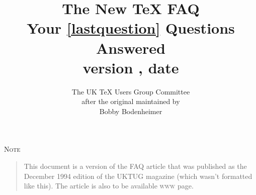 \documentclass[a4paper]{faq}
\begin{document}
\title{The New \TeX{} FAQ\\
       Your \protect\ref{lastquestion} Questions Answered\\
       version \fileversion, date \filedate}
\author{The UK \TeX{} Users Group Committee\\
after the original maintained by \\
Bobby Bodenheimer} 
\maketitle

\centerline{\textsc{Note}}

\begin{quotation}\small
  This document is a version of the FAQ article that was published as
  the December 1994 edition of the UKTUG magazine \BV{} (which wasn't
  formatted like this).%
  The article is also to be available \textsc{www} page.
\end{quotation}

\begin{multicols}{2}
\tableofcontents
\end{multicols}

\ifnotreadCTAN
  
  
  \notreadCTANfalse
\fi

\Dings

\begin{multicols}{2}

\end{multicols}

\end{document}
